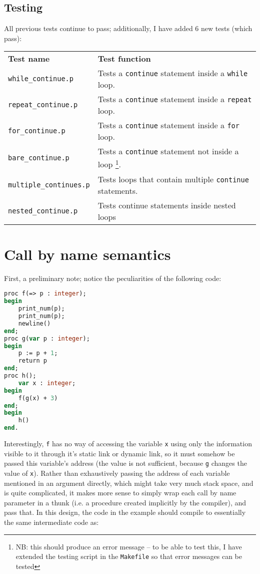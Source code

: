 \documentclass[a4paper,10pt]{article}
\begin{document}
\subsection{Testing}
All previous tests continue to pass; additionally, I have added 6 new tests (which pass): \\
\begin{tabularx}{\linewidth}{ |X|X| }
\hline
    \textbf{Test name} & \textbf{Test function} \\
\hhline{|=|=|}
    \texttt{while\_continue.p} & Tests a \texttt{continue} statement inside a \texttt{while} loop. \\
\hline
    \texttt{repeat\_continue.p} & Tests a \texttt{continue} statement inside a \texttt{repeat} loop. \\
\hline
    \texttt{for\_continue.p} & Tests a \texttt{continue} statement inside a \texttt{for} loop. \\
\hline
    \texttt{bare\_continue.p} & Tests a \texttt{continue} statement not inside a loop \footnote{NB: this should produce an error message -- to be able to test this, I have extended the testing script in the \texttt{Makefile} so that error messages can be tested}. \\
\hline
    \texttt{multiple\_continues.p} & Tests loops that contain multiple \texttt{continue} statements. \\
\hline
    \texttt{nested\_continue.p} & Tests continue statements inside nested loops \\
\hline
\end{tabularx}

\section{Call by name semantics}
First, a preliminary note; notice the peculiarities of the following code:
\begin{lstlisting}[language=pascal, style=pascal, frame=single]
proc f(=> p : integer);
begin
    print_num(p);
    print_num(p);
    newline()
end;
proc g(var p : integer);
begin
    p := p + 1;
    return p
end;
proc h();
    var x : integer;
begin
    f(g(x) + 3)
end;
begin
    h()
end.
\end{lstlisting}

Interestingly, \texttt{f} has no way of accessing the variable \texttt{x} using only the information visible to it through it's static link or dynamic link, so it must somehow be passed this variable's address (the value is not sufficient, because \texttt{g} changes the value of \texttt{x}). Rather than exhaustively passing the address of each variable mentioned in an argument directly, which might take very much stack space, and is quite complicated, it makes more sense to simply wrap each call by name parameter in a thunk (i.e. a procedure created implicitly by the compiler), and pass that. In this design, the code in the example should compile to essentially the same intermediate code as:
\end{document}
